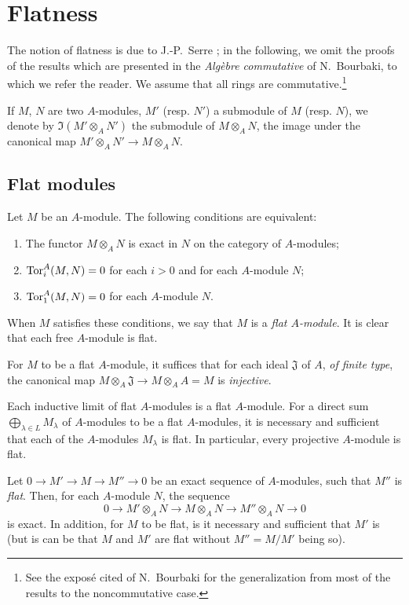 \section{Flatness}
\label{section-flatness}

\begin{env}[6.0]
\label{0.6.0.0}
The notion of flatness is due to J.-P.~Serre \cite{I-16}; in the following, we omit the
proofs of the results which are presented in the {\em Alg\`ebre commutative} of N.~Bourbaki,
to which we refer the reader. We assume that all rings are commutative.\footnote{See the
expos\'e cited of N.~Bourbaki for the generalization from most of the results to the
noncommutative case.}

If $M$, $N$ are two $A$-modules, $M'$ (resp. $N'$) a submodule of $M$ (resp. $N$), we denote
by $\Im(M'\otimes_A N')$ the submodule of $M\otimes_A N$, the image under the canonical map
$M'\otimes_A N'\to M\otimes_A N$.
\end{env}

\subsection{Flat modules}
\label{subsection-flat-modules}

\begin{env}[6.1.1]
\label{0.6.1.1}
Let $M$ be an $A$-module. The following conditions are equivalent:
\begin{enumerate}[label=(\alph*)]
  \item The functor $M\otimes_A N$ is exact in $N$ on the category of $A$-modules;
  \item ${\mathop{\mathrm{Tor}}\nolimits}_i^A(M,N)=0$ for each $i>0$ and for each $A$-module $N$;
  \item ${\mathop{\mathrm{Tor}}\nolimits}_1^A(M,N)=0$ for each $A$-module $N$.
\end{enumerate}

When $M$ satisfies these conditions, we say that $M$ is a
{\em flat $A$-module}. It is clear that each free $A$-module is flat.

For $M$ to be a flat $A$-module, it suffices that for each ideal $\mathfrak{J}$
of $A$, {\em of finite type}, the canonical map
$M\otimes_A\mathfrak{J}\to M\otimes_A A=M$ is {\em injective}.
\end{env}

\begin{env}[6.1.2]
\label{0.6.1.2}
Each inductive limit of flat $A$-modules is a flat $A$-module. For a direct sum
$\bigoplus_{\lambda\in L}M_\lambda$ of $A$-modules to be a flat $A$-modules, it
is necessary and sufficient that each of the $A$-modules $M_\lambda$ is flat. In
particular, every projective $A$-module is flat.

Let $0\to M'\to M\to M''\to 0$ be an exact sequence of $A$-modules, such that
$M''$ is {\em flat}. Then, for each $A$-module $N$, the sequence
\[
  0\longrightarrow M'\otimes_A N\longrightarrow M\otimes_A N
  \longrightarrow M''\otimes_A N\longrightarrow 0
\]
is exact. In addition, for $M$ to be flat, is it necessary and sufficient that
$M'$ is (but is can be that $M$ and $M'$ are flat without $M''=M/M'$ being so).
\end{env}

